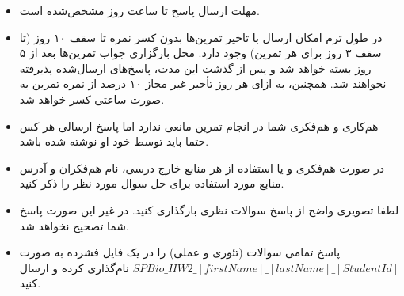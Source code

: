 \begin{itemize}
	\small
	\setlength\itemsep{0.05em}
	\item
	مهلت ارسال پاسخ تا ساعت  روز مشخص‌شده است.
	\item
	در طول ترم امکان ارسال با تاخیر تمرین‌ها بدون کسر نمره تا سقف ۱۰ روز (تا سقف ۳ روز برای هر تمرین) وجود دارد. محل بارگزاری جواب تمرین‌ها بعد از ۵ روز بسته خواهد شد و پس از گذشت این مدت، پاسخ‌های ارسال‌شده پذیرفته نخواهند ‌شد. همچنین، به ازای هر روز تأخیر غیر مجاز ۱۰ درصد از نمره تمرین به صورت ساعتی کسر خواهد شد.
	\item		
	هم‌کاری و هم‌فکری شما در انجام تمرین مانعی ندارد اما پاسخ ارسالی هر کس حتما باید توسط خود او نوشته شده‌ باشد. 
	\item
	در صورت هم‌فکری و یا استفاده از هر منابع خارج درسی، نام هم‌فکران و آدرس منابع مورد استفاده ‌برای حل سوال مورد نظر را ذکر‌ کنید.
	\item
	لطفا تصویری واضح از پاسخ سوالات نظری بارگذاری کنید. در غیر این صورت پاسخ شما تصحیح نخواهد شد.
	\item
	\footnotesize
پاسخ تمامی سوالات (تئوری و عملی) را در یک فایل فشرده به صورت 
\scriptsize
	$SPBio\_HW2\_[firstName]\_[lastName]\_[StudentId]$
	\footnotesize
	نام‌گذاری کرده و ارسال کنید.
\end{itemize}